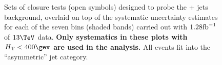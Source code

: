 \clearpage
\begin{figure}[h!]
  \begin{center}
     ~~
     \\
     ~~
     \\
    \caption{Sets of closure tests (open symbols) designed to probe
      the \znunu + jets background, overlaid on top of
      the systematic uncertainty estimates for each of the seven
      \scalht bins (shaded bands) carried out with $1.28\text{fb}^{-1}$ of
      $13\tev$ data. {\bf Only systematics in these plots with
      $\scalht<400\gev$ are used in the analysis.} All events fit 
      into the ``asymmetric'' jet
      category.}
    \label{fig:ZinvclosureDataAsymlt400}
  \end{center} 
\end{figure}

